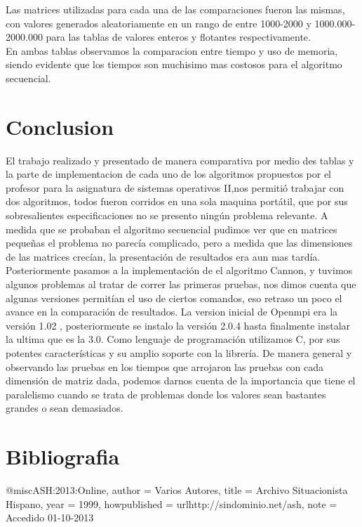 \documentclass[12pt]{article}
\begin{document}
\begin{titlepage}
Las matrices utilizadas para cada una de las comparaciones fueron las mismas, con valores generados aleatoriamente en un rango de entre 1000-2000 y 1000.000-2000.000 para las tablas de valores enteros y flotantes respectivamente.\\
En ambas tablas observamos la comparacion entre tiempo y uso de memoria, siendo evidente que los tiempos son muchisimo mas costosos para el algoritmo secuencial.

\section*{Conclusion}
El trabajo realizado y presentado de manera comparativa por medio des tablas y la parte de implementacion de cada uno de los algoritmos propuestos por el profesor para la asignatura de sistemas operativos II,nos permitió trabajar con dos algoritmos, todos fueron corridos en una sola maquina portátil, que por sus sobresalientes especificaciones no se presento ningún problema relevante.
A medida que se probaban el algoritmo secuencial pudimos ver que en matrices pequeñas el problema no parecía complicado, pero a medida que las dimensiones de las matrices crecían, la presentación de resultados era aun mas tardía.
Posteriormente pasamos a la implementación de el algoritmo Cannon, y tuvimos algunos problemas al tratar de correr las primeras pruebas, nos dimos cuenta que algunas versiones permitían el uso de ciertos comandos, eso retraso un poco el avance en la comparación de resultados. La version inicial de Openmpi era la versión 1.02 , posteriormente se instalo la versión 2.0.4 hasta finalmente instalar la ultima que es la 3.0. 
Como lenguaje de programación utilizamos C, por sus potentes características y su amplio soporte con la librería.
De manera general y observando las pruebas en los tiempos que arrojaron las pruebas con cada dimensión de matriz dada, podemos darnos cuenta de la importancia que tiene el paralelismo cuando se trata de problemas donde los valores sean bastantes grandes o sean demasiados.
  


\section*{Bibliografia}

@misc{ASH:2013:Online,
author = {Varios Autores},
title = {Archivo Situacionista Hispano},
year = {1999},
howpublished = {url{http://sindominio.net/ash}},
note = {Accedido 01-10-2013}
}








\end{titlepage}
\end{document}
